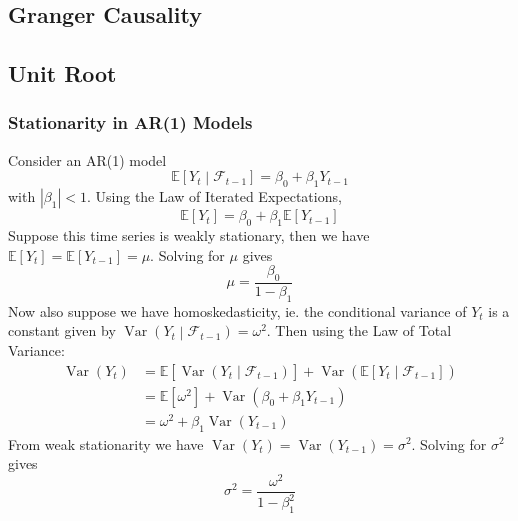 \documentclass[11pt]{report} %
\begin{document}
\subsection{Granger Causality}

\subsection{Unit Root}

\subsubsection{Stationarity in AR(1) Models}

Consider an AR(1) model
\begin{equation}
\mathbb{E}\left[Y_{t} \middle|\mathcal{F}_{t-1}\right] = \beta_{0} + \beta_{1}Y_{t - 1}
\end{equation}
with $\left|\beta_{1}\right| < 1$. Using the Law of Iterated Expectations,
\begin{equation}
\mathbb{E}\left[Y_{t}\right] = \beta_{0} + \beta_{1}\mathbb{E}\left[Y_{t - 1}\right]
\end{equation}
Suppose this time series is weakly stationary, then we have $\mathbb{E}\left[Y_{t}\right] = \mathbb{E}\left[Y_{t - 1}\right] = \mu$. Solving for $\mu$ gives
\begin{equation}
\mu = \dfrac{\beta_{0}}{1 - \beta_{1}}
\end{equation}
Now also suppose we have homoskedasticity, ie. the conditional variance of $Y_{t}$ is a constant given by $\operatorname{Var}\left(Y_{t}\middle|\mathcal{F}_{t-1}\right) = \omega^{2}$. Then using the Law of Total Variance:
\begin{align}
\operatorname{Var}\left(Y_{t}\right) &= \mathbb{E}\left[\operatorname{Var}\left(Y_{t}\middle|\mathcal{F}_{t-1}\right)\right] + \operatorname{Var}\left( \mathbb{E}\left[Y_{t}\middle|\mathcal{F}_{t-1}\right]\right) \\
&= \mathbb{E}\left[\omega^{2}\right] + \operatorname{Var}\left(\beta_{0} + \beta_{1}Y_{t - 1}\right) \\
&= \omega^{2} + \beta_{1}\operatorname{Var}\left(Y_{t - 1}\right)
\end{align}
From weak stationarity we have $\operatorname{Var}\left(Y_{t}\right) = \operatorname{Var}\left(Y_{t - 1}\right) = \sigma^{2}$. Solving for $\sigma^{2}$ gives
\begin{equation}
\sigma^{2} = \dfrac{\omega^{2}}{1 - \beta_{1}^{2}}
\end{equation}
\end{document}
